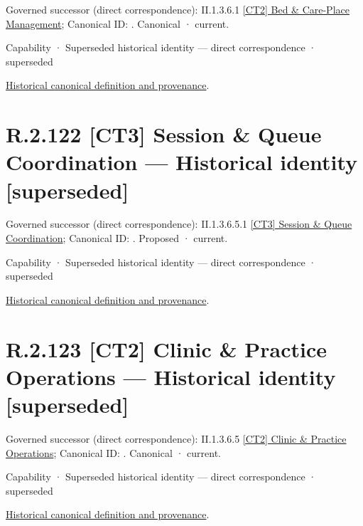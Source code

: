 {\small Governed successor (direct correspondence): II.1.3.6.1 \hyperref[element:f117ccec0bfa4f738e6ddb646b3534a2]{[CT2] Bed \& Care-Place Management}; Canonical ID: \texttt{}. Canonical · current.}\par
\label{element:c94d29b7d1c045dabc7814ceea795484}
{\small Capability · Superseded historical identity — direct correspondence · superseded}\par
\href{../../../../../../../continuum/strategy/capability/c94d29b7d1c045dabc7814ceea795484.md}{Historical canonical definition and provenance}.\par
\section*{R.2.122 [CT3] Session \& Queue Coordination — Historical identity [superseded]}
\label{navigation:R.2.122}

{\small Governed successor (direct correspondence): II.1.3.6.5.1 \hyperref[element:22981a95ca6e466582363706fde8fceb]{[CT3] Session \& Queue Coordination}; Canonical ID: \texttt{}. Proposed · current.}\par
\label{element:5298c6170cef4f05a6d956da716071bd}
{\small Capability · Superseded historical identity — direct correspondence · superseded}\par
\href{../../../../../../../continuum/strategy/capability/5298c6170cef4f05a6d956da716071bd.md}{Historical canonical definition and provenance}.\par
\section*{R.2.123 [CT2] Clinic \& Practice Operations — Historical identity [superseded]}
\label{navigation:R.2.123}

{\small Governed successor (direct correspondence): II.1.3.6.5 \hyperref[element:3dffe63e03124efab255204ee4e9a5d9]{[CT2] Clinic \& Practice Operations}; Canonical ID: \texttt{}. Canonical · current.}\par
\label{element:0856d2daf2ba4b92b5390b38b98efb54}
{\small Capability · Superseded historical identity — direct correspondence · superseded}\par
\href{../../../../../../../continuum/strategy/capability/0856d2daf2ba4b92b5390b38b98efb54.md}{Historical canonical definition and provenance}.\par
